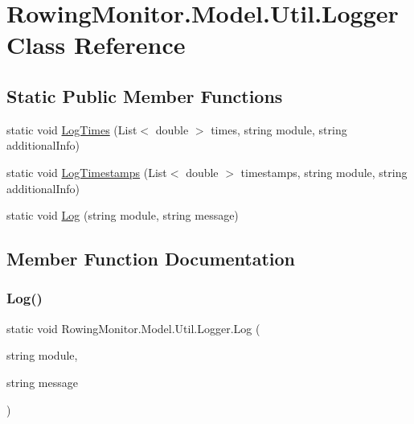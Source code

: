 \hypertarget{class_rowing_monitor_1_1_model_1_1_util_1_1_logger}{}\section{Rowing\+Monitor.\+Model.\+Util.\+Logger Class Reference}
\label{class_rowing_monitor_1_1_model_1_1_util_1_1_logger}
\subsection*{Static Public Member Functions}
\begin{DoxyCompactItemize}
\item 
static void \hyperlink{class_rowing_monitor_1_1_model_1_1_util_1_1_logger_aa64fcd49049d76a54281be04da4c0d5b}{Log\+Times} (List$<$ double $>$ times, string module, string additional\+Info)
\item 
static void \hyperlink{class_rowing_monitor_1_1_model_1_1_util_1_1_logger_a2e14f39dd12fdf95095720632e55b621}{Log\+Timestamps} (List$<$ double $>$ timestamps, string module, string additional\+Info)
\item 
static void \hyperlink{class_rowing_monitor_1_1_model_1_1_util_1_1_logger_a1b414168be6dbaa6947e29cef91ac47f}{Log} (string module, string message)
\end{DoxyCompactItemize}


\subsection{Member Function Documentation}
\mbox{\label{class_rowing_monitor_1_1_model_1_1_util_1_1_logger_a1b414168be6dbaa6947e29cef91ac47f}} 
\subsubsection{\texorpdfstring{Log()}{Log()}}
{\footnotesize\ttfamily static void Rowing\+Monitor.\+Model.\+Util.\+Logger.\+Log (\begin{DoxyParamCaption}\item[{string}]{module,  }\item[{string}]{message }\end{DoxyParamCaption})\hspace{0.3cm}{\ttfamily [static]}}

